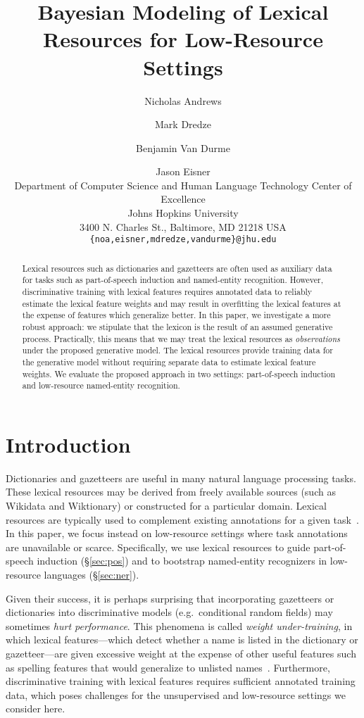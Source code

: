 \documentclass[11pt]{article}
\title{Bayesian Modeling of Lexical Resources for Low-Resource Settings}
\author{Nicholas Andrews \and Mark Dredze \and Benjamin Van Durme \and Jason Eisner \\
  Department of Computer Science and Human Language Technology Center of Excellence \\
  Johns Hopkins University \\
  3400 N. Charles St., Baltimore, MD 21218 USA \\
  {\tt \{noa,eisner,mdredze,vandurme\}@jhu.edu}
}
\begin{document}
\maketitle

\begin{abstract}
Lexical resources such as dictionaries and gazetteers are often used
as auxiliary data for tasks such as part-of-speech induction and named-entity
recognition. However, discriminative training with lexical features requires annotated data to reliably estimate the lexical feature weights and may result in overfitting the lexical features at the expense of features which generalize better.
In this paper, we investigate a more robust approach: we stipulate
that the lexicon is the result of an assumed generative
process. Practically, this means that we may treat the lexical
resources as \emph{observations} under the proposed generative model.
The lexical resources provide training data for the generative model
without requiring separate data to estimate lexical feature
weights. We evaluate the proposed approach in two settings:
part-of-speech induction and low-resource named-entity recognition.
\end{abstract}

\section{Introduction}\label{sec:intro}

Dictionaries and gazetteers are useful in many natural language
processing tasks.
These lexical resources may be derived
from freely available sources (such as Wikidata and Wiktionary)
or constructed for a particular domain.
Lexical resources are typically used to complement existing annotations for a given task~\cite{Ando2005,Collobert2011}.
In this paper, we focus instead on low-resource settings where task annotations are unavailable or scarce. Specifically, we use lexical resources to guide part-of-speech induction (\S\ref{sec:pos}) and to bootstrap named-entity recognizers in low-resource languages (\S\ref{sec:ner}).   

Given their success, it is perhaps surprising that incorporating
gazetteers or dictionaries into discriminative models (e.g.\
conditional random fields) may sometimes \emph{hurt performance}. This
phenomena is called \emph{weight under-training}, in which lexical
features---which detect whether a name is listed in the dictionary or
gazetteer---are given excessive weight at the expense of other useful
features such as spelling features that would generalize to unlisted
names~\cite{smith2005logarithmic,Sutton2006,Smith2006}. Furthermore, discriminative training with lexical features requires sufficient annotated training data, which poses challenges for the unsupervised and low-resource settings we consider here.
\end{document}
